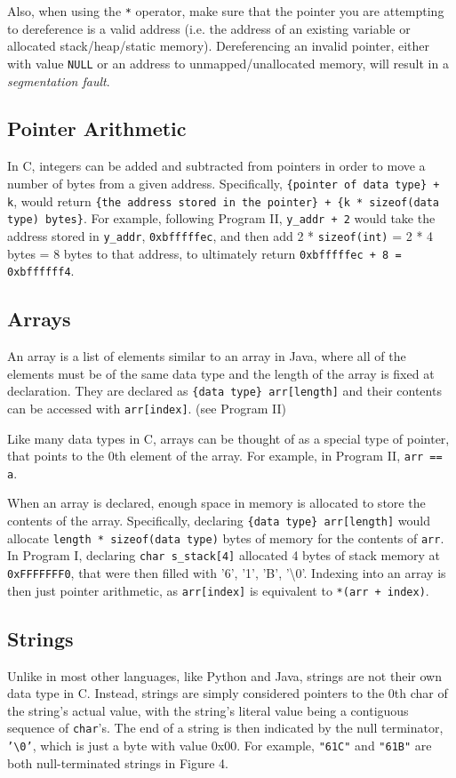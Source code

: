 \documentclass{article}
\begin{document}
Also, when using the \texttt{*} operator, make sure that the pointer you are attempting to dereference is a valid address (i.e. the address of an existing variable or allocated stack/heap/static memory). Dereferencing an invalid pointer, either with value \texttt{NULL} or an address to unmapped/unallocated memory, will result in a \textit{segmentation fault}.

\subsection{Pointer Arithmetic}
In C, integers can be added and subtracted from pointers in order to move a number of bytes from a given address. Specifically, \texttt{\{pointer of data type\} + k}, would return \texttt{\{the address stored in the pointer\} + \{k * sizeof(data type) bytes\}}. For example, following Program II, \texttt{y\_addr + 2} would take the address stored in \texttt{y\_addr}, \texttt{0xbfffffec}, and then add 2 * \texttt{sizeof(int)} = 2 * 4 bytes = 8 bytes to that address, to ultimately return \texttt{0xbfffffec + 8 = 0xbffffff4}. 

\subsection{Arrays}
An array is a list of elements similar to an array in Java, where all of the elements must be of the same data type and the length of the array is fixed at declaration. They are declared as \texttt{\{data type\} arr[length]} and their contents can be accessed with \texttt{arr[index]}. (see Program II)

Like many data types in C, arrays can be thought of as a special type of pointer, that points to the 0th element of the array.  For example, in Program II, \texttt{arr == a}.

When an array is declared, enough space in memory is allocated to store the contents of the array. Specifically, declaring \texttt{\{data type\} arr[length]} would allocate \texttt{length * sizeof(data type)} bytes of memory for the contents of \texttt{arr}. In Program I, declaring \texttt{char s\_stack[4]} allocated 4 bytes of stack memory at \texttt{0xFFFFFFF0}, that were then filled with '6', '1', 'B', '\textbackslash0'. Indexing into an array is then just pointer arithmetic, as \texttt{arr[index]} is equivalent to \texttt{*(arr + index)}.

\subsection{Strings} 
Unlike in most other languages, like Python and Java, strings are not their own data type in C. Instead, strings are simply considered pointers to the 0th char of the string's actual value, with the string's literal value being a contiguous sequence of \texttt{char}'s. The end of a string is then indicated by the null terminator, \texttt{'\textbackslash0'}, which is just a byte with value 0x00. For example, \texttt{"61C"} and \texttt{"61B"} are both null-terminated strings in Figure 4.
\end{document}
